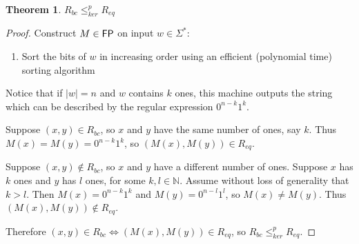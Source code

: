 \documentclass{article}
\newtheorem{theorem}{Theorem}[section]
\theoremstyle{definition}
\newcommand{\sigmastar}{\Sigma^{*}}
\newcommand{\kr}{\leq^{p}_{ker}}
\begin{document}
\begin{theorem}$R_{bc}\kr R_{eq}$\end{theorem}
\begin{proof}
  Construct $M\in {\ensuremath{\mathsf{FP}}}$ on input $w\in\sigmastar$:
  \begin{enumerate}
  \item Sort the bits of $w$ in increasing order using an efficient (polynomial
    time) sorting algorithm
  \end{enumerate}
  Notice that if $|w|=n$ and $w$ contains $k$ ones, this machine outputs
  the string which can be described by the regular expression $0^{n-k}1^k$.

  Suppose $(x,y)\in R_{bc}$, so $x$ and $y$ have the same number of ones, say
  $k$. Thus $M(x)=M(y)=0^{n-k}1^k$, so $(M(x),M(y))\in R_{eq}$.
  
  Suppose $(x,y)\notin R_{bc}$, so $x$ and $y$ have a different number of
  ones. Suppose $x$ has $k$ ones and $y$ has $l$ ones, for some
  $k,l\in\mathbb{N}$. Assume without loss of generality that $k>l$. Then
  $M(x)=0^{n-k}1^{k}$ and $M(y)=0^{n-l}1^{l}$, so $M(x)\neq M(y)$. Thus
  $(M(x),M(y))\notin R_{eq}$.

  Therefore $(x,y)\in R_{bc} \iff (M(x),M(y))\in R_{eq}$, so $R_{bc}\kr
  R_{eq}$.
\end{proof}
\end{document}
